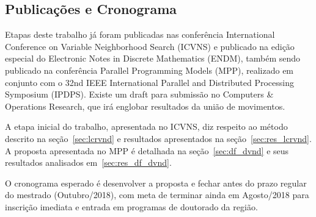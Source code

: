 \subsection{Publicações e Cronograma}

Etapas deste trabalho já foram publicadas nas conferência International Conference on Variable Neighborhood Search (ICVNS) e publicado na edição especial do Electronic Notes in Discrete Mathematics (ENDM), também sendo publicado na conferência Parallel Programming Models (MPP), realizado em conjunto com o 32nd IEEE International Parallel and Distributed Processing Symposium (IPDPS). Existe um draft para submissão no Computers \& Operations Research, que irá englobar resultados da união de movimentos.

A etapa inicial do trabalho, apresentada no ICVNS, diz respeito ao método descrito na seção~\ref{sec:lcrvnd} e resultados apresentados na seção~\ref{sec:res_lcrvnd}.
A proposta apresentada no MPP é detalhada na seção~\ref{sec:df_dvnd} e seus resultados analisados em~\ref{sec:res_df_dvnd}.

O cronograma esperado é desenvolver a proposta e fechar antes do prazo regular do mestrado (Outubro/2018), com meta de terminar ainda em Agosto/2018 para inscrição imediata e entrada em programas de doutorado da região.
